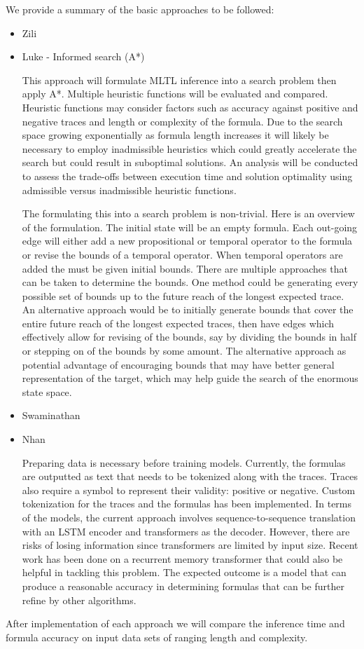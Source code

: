 \documentclass[12pt]{article}
\begin{document}
We provide a summary of the basic approaches to be followed:
\begin{itemize}
    \item Zili
    \item Luke - Informed search (A*)

This approach will formulate MLTL inference into a search problem then apply A*.  Multiple heuristic functions will be evaluated and compared.  Heuristic functions may consider factors such as accuracy against positive and negative traces and length or complexity of the formula.  Due to the search space growing exponentially as formula length increases it will likely be necessary to employ inadmissible heuristics which could greatly accelerate the search but could result in suboptimal solutions.  An analysis will be conducted to assess the trade-offs between execution time and solution optimality using admissible versus inadmissible heuristic functions. 

The formulating this into a search problem is non-trivial. Here is an overview of the formulation. The initial state will be an empty formula. Each out-going edge will either add a new propositional or temporal operator to the formula or revise the bounds of a temporal operator.  When temporal operators are added the must be given initial bounds. There are multiple approaches that can be taken to determine the bounds. One method could be generating every possible set of bounds up to the future reach of the longest expected trace. An alternative approach would be to initially generate bounds that cover the entire future reach of the longest expected traces, then have edges which effectively allow for revising of the bounds, say by dividing the bounds in half or stepping on of the bounds by some amount. The alternative approach as potential advantage of encouraging bounds that may have better general representation of the target, which may help guide the search of the enormous state space.
    \item Swaminathan
    \item Nhan

Preparing data is necessary before training models. Currently, the formulas are outputted as text that needs to be tokenized along with the traces. Traces also require a symbol to represent their validity: positive or negative. Custom tokenization for the traces and the formulas has been implemented. In terms of the models, the current approach involves sequence-to-sequence translation with an LSTM encoder and transformers as the decoder. However, there are risks of losing information since transformers are limited by input size. Recent work has been done on a recurrent memory transformer that could also be helpful in tackling this problem. The expected outcome is a model that can produce a reasonable accuracy in determining formulas that can be further refine by other algorithms.
\end{itemize} 


After implementation of each approach we will compare the inference time and formula accuracy on input data sets of ranging length and complexity.
\end{document}
